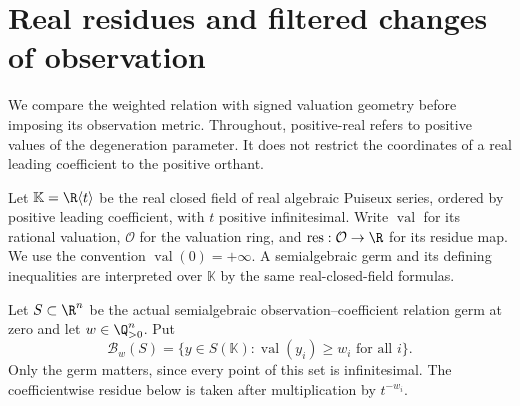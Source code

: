 \section{Real residues and filtered changes of observation}\label{sec:v101-residue}
We compare the weighted relation with signed valuation geometry before
imposing its observation metric. Throughout, positive-real refers to
positive values of the degeneration parameter. It does not restrict
the coordinates of a real leading coefficient to the positive orthant.

Let $\mathbb K=\R\langle t\rangle$ be the real closed field of real
algebraic Puiseux series, ordered by positive leading coefficient, with
$t$ positive infinitesimal. Write $\operatorname{val}$ for its rational
valuation, $\mathcal O$ for the valuation ring, and
$\operatorname{res}:\mathcal O\to\R$ for its residue map. We use the
convention $\operatorname{val}(0)=+\infty$. A semialgebraic germ and
its defining inequalities are interpreted over $\mathbb K$ by the
same real-closed-field formulas.

Let $S\subset\R^n$ be the actual semialgebraic observation--coefficient
relation germ at zero and let $w\in\Q_{>0}^n$. Put
\[
 \mathcal B_w(S)=\{y\in S(\mathbb K):
                          \operatorname{val}(y_i)\ge w_i\text{ for all }i\}.
\]
Only the germ matters, since every point of this set is infinitesimal.
The coefficientwise residue below is taken after multiplication by
$t^{-w_i}$.

